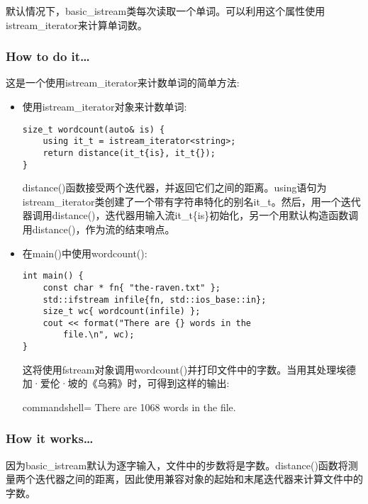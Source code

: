 
默认情况下，basic\_istream类每次读取一个单词。可以利用这个属性使用istream\_iterator来计算单词数。

\subsubsection{How to do it…}

这是一个使用istream\_iterator来计数单词的简单方法:

\begin{itemize}
\item 
使用istream\_iterator对象来计数单词:

\begin{lstlisting}[style=styleCXX]
size_t wordcount(auto& is) {
	using it_t = istream_iterator<string>;
	return distance(it_t{is}, it_t{});
}
\end{lstlisting}

distance()函数接受两个迭代器，并返回它们之间的距离。using语句为istream\_iterator类创建了一个带有字符串特化的别名it\_t。然后，用一个迭代器调用distance()，迭代器用输入流it\_t\{is\}初始化，另一个用默认构造函数调用distance()，作为流的结束哨点。

\item 
在main()中使用wordcount():

\begin{lstlisting}[style=styleCXX]
int main() {
	const char * fn{ "the-raven.txt" };
	std::ifstream infile{fn, std::ios_base::in};
	size_t wc{ wordcount(infile) };
	cout << format("There are {} words in the
		file.\n", wc);
}
\end{lstlisting}

这将使用fstream对象调用wordcount()并打印文件中的字数。当用其处理埃德加·爱伦·坡的《乌鸦》时，可得到这样的输出:

\begin{tcblisting}{commandshell={}}
There are 1068 words in the file.
\end{tcblisting}
\end{itemize}

\subsubsection{How it works…}

因为basic\_istream默认为逐字输入，文件中的步数将是字数。distance()函数将测量两个迭代器之间的距离，因此使用兼容对象的起始和末尾迭代器来计算文件中的字数。

